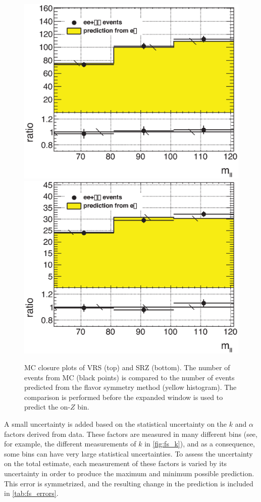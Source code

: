 \begin{centering}
\begin{figure}[bth]
\myfloatalign
\includegraphics[width=.85\linewidth]{figures/fs/ee+mm_ratio_mll_VRZ_widened.eps}
\includegraphics[width=.85\linewidth]{figures/fs/ee+mm_ratio_mll_SRZ_widened.eps}
\caption{MC closure plots of VRS (top) and SRZ (bottom). The number of events from MC (black points) is compared to the number of events predicted from the flavor symmetry method (yellow histogram). The comparison is performed before the expanded \mll window is used to predict the on-$Z$ bin.}
\label{fig:fs_closure}
\end{figure}
\end{centering}

A small uncertainty is added based on the statistical uncertainty on the $k$ and $\alpha$ factors derived from data. These factors are measured in many different bins (see, for example, the different measurements of $k$ in \autoref{fig:fs_k}), and as a consequence, some bins can have very large statistical uncertainties. To assess the uncertainty on the total estimate, each measurement of these factors is varied by its uncertainty in order to produce the maximum and minimum possible prediction. This error is symmetrized, and the resulting change in the prediction is included in \autoref{tab:fs_errors}.

